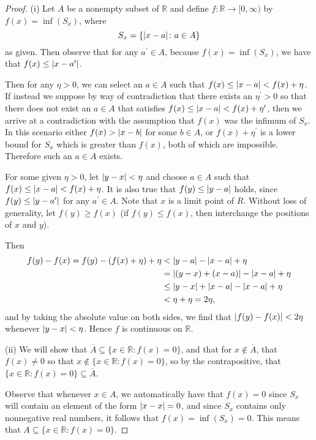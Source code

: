 \documentclass[12pt]{amsart}
\begin{document}
\begin{proof}
    (i) Let $A$ be a nonempty subset of $\mathbb{R}$ and define $f\colon \mathbb{R}\to [0,\infty)$ by $f(x) = \inf(S_x)$, where \[S_x = \{\abs{x-a}\colon a\in A\}\] as given. Then observe that for any $a^{\prime}\in A$, because $f(x) = \inf(S_x)$, we have that $f(x)\leq \abs{x-a^{\prime}}$.
    
    Then for any $\eta > 0$, we can select an $a\in A$ such that $f(x)\leq \abs{x-a} < f(x) + \eta$. If instead we suppose by way of contradiction that there exists an $\eta^{\prime}>0$ so that there does not exist an $a\in A$ that satisfies $f(x)\leq \abs{x-a} < f(x) + \eta^{\prime}$, then we arrive at a contradiction with the assumption that $f(x)$ was the infimum of $S_x$. In this scenario either $f(x)>\abs{x-b}$ for some $b\in A$, or $f(x)+\eta^{\prime}$ is a lower bound for $S_x$ which is greater than $f(x)$, both of which are impossible. Therefore such an $a\in A$ exists.

    For some given $\eta >0$, let $\abs{y-x}< \eta$ and choose $a\in A$ such that $f(x) \leq \abs{x-a} < f(x) + \eta$. It is also true that $f(y) \leq \abs{y-a}$ holds, since $f(y) \leq \abs{y-a^{\prime}}$ for any $a^{\prime}\in A$. Note that $x$ is a limit point of $R$. Without loss of generality, let $f(y) \geq f(x)$ (if $f(y) \leq f(x)$, then interchange the positions of $x$ and $y$).

    Then \begin{align*}
        f(y) - f(x) = f(y) - (f(x)+\eta) + \eta &< \abs{y-a} - \abs{x-a} + \eta \\
        &=  \abs{(y-x)+(x-a)} - \abs{x-a} + \eta \\
        &\leq \abs{y-x} +\abs{x-a} - \abs{x-a} + \eta\\
        &< \eta + \eta = 2\eta,
    \end{align*}
    and by taking the absolute value on both sides, we find that $\abs{f(y)-f(x)} < 2\eta$ whenever $\abs{y-x}< \eta$. Hence $f$ is continuous on $\mathbb{R}$.

    (ii) We will show that $\overline{A}\subseteq \{x\in \mathbb{R}:f(x)=0\}$, and that for $x\not\in \overline{A}$, that $f(x) \neq 0$ so that $x\not\in \{x\in \mathbb{R}:f(x)=0\}$, so by the contrapositive, that $\{x\in \mathbb{R}:f(x)=0\} \subseteq \overline{A}$.
    
    Observe that whenever $x\in A$, we automatically have that $f(x) = 0$ since $S_x$ will contain an element of the form $\abs{x-x} = 0$, and since $S_x$ contains only nonnegative real numbers, it follows that $f(x) = \inf(S_x) = 0$. This means that $A\subseteq \{x\in \mathbb{R}\colon f(x) = 0\}$.


\end{proof}
\end{document}
